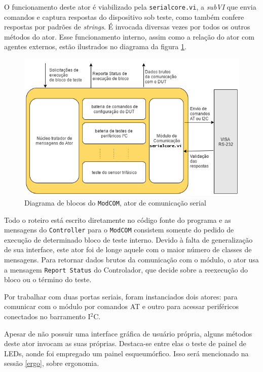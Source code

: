             O funcionamento deste ator é viabilizado pela \texttt{serialcore.vi}, a \textit{subVI} que envia comandos e captura respostas do dispositivo sob teste, como também confere respostas por padrões de \textit{strings}. É invocada diversas vezes por todos os outros métodos do ator. Esse funcionamento interno, assim como a relação do ator com agentes externos, estão ilustrados no diagrama da figura \ref{fig:diagserial}. 
            
            \begin{figure}
                \centering
                \includegraphics[width=1\linewidth]{fig/diag/blocoserial.png}
                \caption{Diagrama de blocos do \texttt{ModCOM}, ator de comunicação serial}
                \label{fig:diagserial}
            \end{figure}

            Todo o roteiro está escrito diretamente no código fonte do programa e as mensagens do \texttt{Controller} para o \texttt{ModCOM} consistem somente do pedido de execução de determinado bloco de teste interno. Devido à falta de generalização de sua interface,  este ator foi de longe aquele com o maior número de classes de mensagens. Para retornar dados brutos da comunicação com o módulo, o ator usa a mensagem \texttt{Report Status} do Controlador, que decide sobre a reexecução do bloco ou o término do teste.
            
            Por trabalhar com duas portas seriais, foram instanciados dois atores: para comunicar com o módulo por comandos AT e outro para acessar periféricos conectados no barramento  I$^{2}$C. 
            
            Apesar de não possuir uma interface gráfica de usuário própria, alguns métodos deste ator invocam as suas próprias. Destaca-se entre elas o teste de painel de LEDs, aonde foi empregado um painel esqueumórfico. Isso será mencionado na sessão \ref{ergo}, sobre ergonomia. 
        
